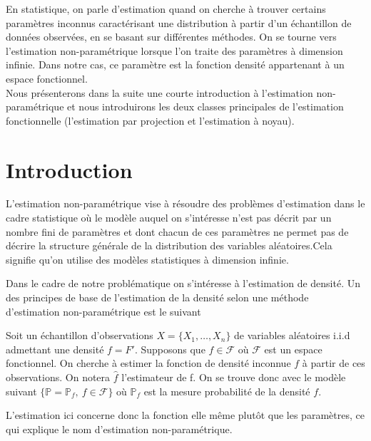 \documentclass[
]{book}
\begin{document}
\hspace*{0.5cm} En statistique, on parle d'estimation quand on cherche à trouver certains paramètres inconnus caractérisant une distribution à partir d'un échantillon de données observées, en se basant sur différentes méthodes.
On se tourne vers l'estimation non-paramétrique lorsque l'on traite des paramètres à dimension infinie. Dans notre cas, ce paramètre est la fonction densité appartenant à un espace fonctionnel.\\
\hspace*{0.5cm} Nous présenterons dans la suite une courte introduction
à l'estimation non-paramétrique et nous introduirons les deux classes
principales de l'estimation fonctionnelle (l'estimation par projection
et l'estimation à noyau).

\hypertarget{introduction}{%
\section{Introduction}\label{introduction}}

L'estimation non-paramétrique vise à résoudre des problèmes d'estimation dans le cadre statistique où le modèle auquel on s'intéresse n'est pas décrit par un nombre fini de paramètres et dont chacun de ces paramètres ne permet pas de décrire la structure générale de la distribution des variables aléatoires.\newline Cela signifie qu'on utilise des modèles statistiques à dimension infinie.

Dans le cadre de notre problématique on s'intéresse à l'estimation de densité.\newline
Un des principes de base de l'estimation de la densité selon une méthode d'estimation non-paramétrique est le suivant \newline

Soit un échantillon d'observations \(X=\{X_1, \dots,X_n\}\) de variables aléatoires i.i.d admettant une densité \(f= F'\). Supposons que \(f \in \mathcal F\) où \(\mathcal{F}\) est un espace fonctionnel. On cherche à estimer la fonction de densité inconnue \(f\) à partir de ces observations.\newline
On notera \(\hat f\) l'estimateur de f.\newline
On se trouve donc avec le modèle suivant \(\{\mathbb P=\mathbb P_f,~f \in \mathcal F\}\)
où \(\mathbb P_f\) est la mesure probabilité de la densité \(f\).

L'estimation ici concerne donc la fonction elle même plutôt que les paramètres, ce qui explique le nom d'estimation non-paramétrique.\newline
\end{document}

